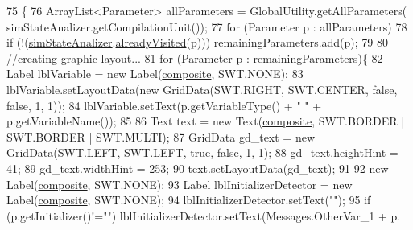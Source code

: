 \begin{DoxyCode}
75                                  \{
76         ArrayList<Parameter> allParameters = GlobalUtility.getAllParameters(
      simStateAnalizer.getCompilationUnit());
77         \textcolor{keywordflow}{for} (Parameter p : allParameters)
78             \textcolor{keywordflow}{if} (!(\hyperlink{classit_1_1isislab_1_1masonassisteddocumentation_1_1mason_1_1wizards_1_1_h___environment_page_ab4fc8e47db987a2303bd362dab615f0c}{simStateAnalizer}.\hyperlink{classit_1_1isislab_1_1masonassisteddocumentation_1_1mason_1_1analizer_1_1_sim_state_analizer_a0a0e3dd3cbc27027c93a4f935382ac55}{alreadyVisited}(p)))    
      remainingParameters.add(p); 
79         
80         \textcolor{comment}{//creating graphic layout...}
81         \textcolor{keywordflow}{for} (Parameter p : \hyperlink{classit_1_1isislab_1_1masonassisteddocumentation_1_1mason_1_1wizards_1_1_h___environment_page_a5d9563244ed9f8e9a055d1678e29d4f2}{remainingParameters})\{
82             Label lblVariable = \textcolor{keyword}{new} Label(\hyperlink{classit_1_1isislab_1_1masonassisteddocumentation_1_1mason_1_1wizards_1_1_h___environment_page_a08701d3343b8c6232831af0077e6cb37}{composite}, SWT.NONE);
83             lblVariable.setLayoutData(\textcolor{keyword}{new} GridData(SWT.RIGHT, SWT.CENTER, \textcolor{keyword}{false}, \textcolor{keyword}{false}, 1, 1));
84             lblVariable.setText(p.getVariableType() + \textcolor{stringliteral}{" "} + p.getVariableName());
85             
86             Text text = \textcolor{keyword}{new} Text(\hyperlink{classit_1_1isislab_1_1masonassisteddocumentation_1_1mason_1_1wizards_1_1_h___environment_page_a08701d3343b8c6232831af0077e6cb37}{composite}, SWT.BORDER | SWT.BORDER | SWT.MULTI);
87             GridData gd\_text = \textcolor{keyword}{new} GridData(SWT.LEFT, SWT.LEFT, \textcolor{keyword}{true}, \textcolor{keyword}{false}, 1, 1);
88             gd\_text.heightHint = 41;
89             gd\_text.widthHint = 253;
90             text.setLayoutData(gd\_text);
91 
92             \textcolor{keyword}{new} Label(\hyperlink{classit_1_1isislab_1_1masonassisteddocumentation_1_1mason_1_1wizards_1_1_h___environment_page_a08701d3343b8c6232831af0077e6cb37}{composite}, SWT.NONE);        
93             Label lblInitializerDetector = \textcolor{keyword}{new} Label(\hyperlink{classit_1_1isislab_1_1masonassisteddocumentation_1_1mason_1_1wizards_1_1_h___environment_page_a08701d3343b8c6232831af0077e6cb37}{composite}, SWT.NONE);
94             lblInitializerDetector.setText(\textcolor{stringliteral}{""});
95             \textcolor{keywordflow}{if} (p.getInitializer()!=\textcolor{stringliteral}{""}) lblInitializerDetector.setText(Messages.OtherVar\_1 + p.

\end{DoxyCode}
